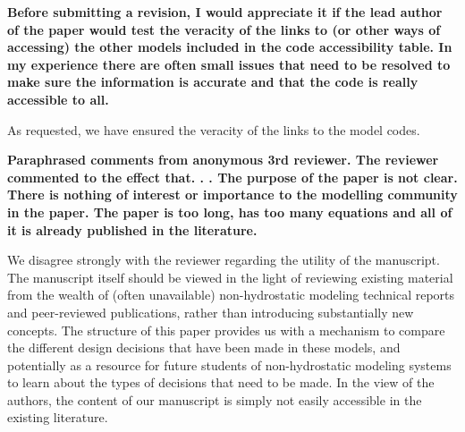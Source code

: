 \documentclass{article}
\begin{document}

\textbf{{Before submitting a revision, I would appreciate it if the lead author of the paper would
test the veracity of the links to (or other ways of accessing) the other models included
in the code accessibility table. In my experience there are often small issues that need
to be resolved to make sure the information is accurate and that the code is really
accessible to all.}}

As requested, we have ensured the veracity of the links to the model codes.


\textbf{{Paraphrased comments from anonymous 3rd reviewer.
The reviewer commented to the effect that. . .
The purpose of the paper is not clear.
There is nothing of interest or importance to the modelling community in the paper.
The paper is too long, has too many equations and all of it is already published in the
literature.}}

We disagree strongly with the reviewer regarding the utility of the manuscript.  The manuscript itself should be viewed in the light of reviewing existing material from the wealth of (often unavailable) non-hydrostatic modeling technical reports and peer-reviewed publications, rather than introducing substantially new concepts.  The structure of this paper provides us with a mechanism to compare the different design decisions that have been made in these models, and potentially as a resource for future students of non-hydrostatic modeling systems to learn about the types of decisions that need to be made.  In the view of the authors, the content of our manuscript is simply not easily accessible in the existing literature.
\end{document}
